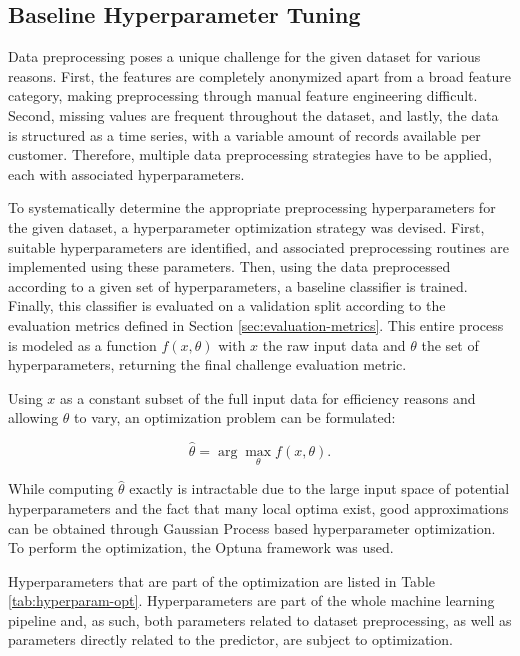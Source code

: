 \documentclass[runningheads]{llncs}
\begin{document}
\subsection{Baseline Hyperparameter Tuning}
\label{sec:baseline-hyperparam-tuning}

Data preprocessing poses a unique challenge for the given dataset for various reasons. First, the features are completely anonymized apart from a broad feature category, making preprocessing through manual feature engineering difficult. Second, missing values are frequent throughout the dataset, and lastly, the data is structured as a time series, with a variable amount of records available per customer. Therefore, multiple data preprocessing strategies have to be applied, each with associated hyperparameters.

To systematically determine the appropriate preprocessing hyperparameters for the given dataset, a hyperparameter optimization strategy was devised. First, suitable hyperparameters are identified, and associated preprocessing routines are implemented using these parameters.  Then, using the data preprocessed according to a given set of hyperparameters, a baseline classifier is trained. Finally, this classifier is evaluated on a validation split according to the evaluation metrics defined in Section \ref{sec:evaluation-metrics}. This entire process is modeled as a function $f(x, \theta)$ with $x$ the raw input data and $\theta$ the set of hyperparameters, returning the final challenge evaluation metric. 

Using $x$ as a constant subset of the full input data for efficiency reasons and allowing $\theta$ to vary, an optimization problem can be formulated:

\begin{equation}
    \hat{\theta} = \arg\max_{\theta} f(x, \theta).
\end{equation}

While computing $\hat{\theta}$ exactly is intractable due to the large input space of potential hyperparameters and the fact that many local optima exist, good approximations can be obtained through Gaussian Process based hyperparameter optimization. To perform the optimization, the Optuna framework \cite{akiba2019optuna} was used.

Hyperparameters that are part of the optimization are listed in Table \ref{tab:hyperparam-opt}. Hyperparameters are part of the whole machine learning pipeline and, as such, both parameters related to dataset preprocessing, as well as parameters directly related to the predictor, are subject to optimization.
\end{document}
